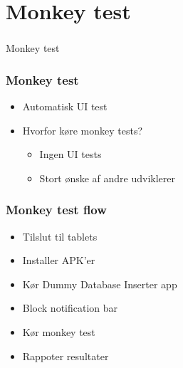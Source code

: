 \section[Monkey test]{Monkey test}
\begin{frame}
  \frametitle{}
  \begin{center}
    {\Huge Monkey test}
  \end{center}
\end{frame}

\begin{frame}
  \frametitle{Monkey test}
  \begin{itemize}
    \item Automatisk UI test
    \item Hvorfor køre monkey tests?
    \begin{itemize}
      \item Ingen UI tests
      \item Stort ønske af andre udviklerer
    \end{itemize}
  \end{itemize}
\end{frame}

\begin{frame}
  \frametitle{Monkey test flow}
  \begin{itemize}
    \item Tilslut til tablets
    \item Installer APK'er
    \item Kør Dummy Database Inserter app
    \item Block notification bar
    \item Kør monkey test
    \item Rappoter resultater
  \end{itemize}
\end{frame}

